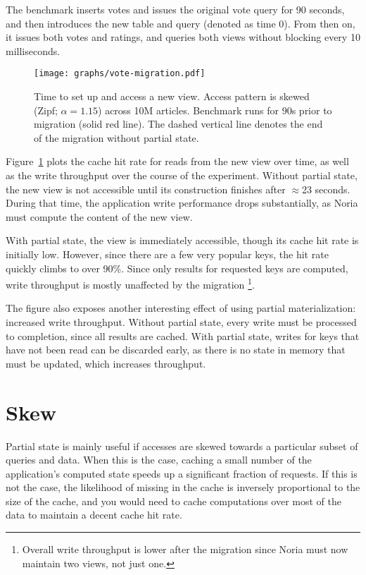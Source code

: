 The benchmark inserts votes and issues the original vote query for 90 seconds,
and then introduces the new table and query (denoted as time 0). From then on,
it issues both votes and ratings, and queries both views without blocking every
10 milliseconds.

\begin{figure}[h]
  \centering
  \texttt{[image: graphs/vote-migration.pdf]}
  \caption{Time to set up and access a new view. Access pattern is skewed (Zipf;
  $\alpha = 1.15$) across 10M articles. Benchmark runs for 90s prior to
  migration (solid red line). The dashed vertical line denotes the end of the
  migration without partial state.}
  \label{f:vote-migration}
\end{figure}

Figure~\ref{f:vote-migration} plots the cache hit rate for reads from the new
view over time, as well as the write throughput over the course of the
experiment. Without partial state, the new view is not accessible until its
construction finishes after $\approx$23 seconds. During that time, the
application write performance drops substantially, as Noria must compute the
content of the new view.

With partial state, the view is immediately accessible, though its cache hit
rate is initially low. However, since there are a few very popular keys, the hit
rate quickly climbs to over 90\%. Since only results for requested keys are
computed, write throughput is mostly unaffected by the migration%
\footnote{Overall write throughput is lower after the migration since Noria must
now maintain two views, not just one.}.

The figure also exposes another interesting effect of using partial
materialization: increased write throughput. Without partial state, every write
must be processed to completion, since all results are cached. With partial
state, writes for keys that have not been read can be discarded early, as there
is no state in memory that must be updated, which increases throughput.

\section{Skew}
\label{s:eval:patterns}

Partial state is mainly useful if accesses are skewed towards a particular
subset of queries and data. When this is the case, caching a small number of the
application's computed state speeds up a significant fraction of requests. If
this is not the case, the likelihood of missing in the cache is inversely
proportional to the size of the cache, and you would need to cache computations
over most of the data to maintain a decent cache hit rate.

